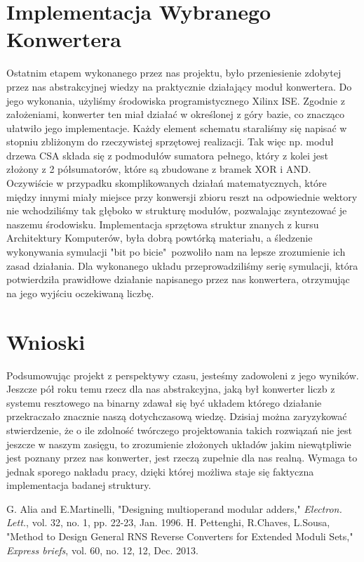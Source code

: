 \documentclass[comsoc]{IEEEtran}
\begin{document}
	
	
	\section{Implementacja Wybranego Konwertera}
	Ostatnim etapem wykonanego przez nas projektu, było przeniesienie zdobytej przez nas abstrakcyjnej wiedzy na praktycznie działający moduł konwertera.
	Do jego wykonania, użyliśmy środowiska programistycznego Xilinx ISE.
	Zgodnie z założeniami, konwerter ten miał działać w określonej z góry bazie, co znacząco ułatwiło jego implementacje. Każdy element schematu staraliśmy się napisać 
	w stopniu zbliżonym do rzeczywistej sprzętowej realizacji. Tak więc np. moduł drzewa CSA składa się z podmodułów sumatora pełnego, który z kolei jest złożony z 2 półsumatorów,
	które są zbudowane z bramek XOR i AND. Oczywiście w przypadku skomplikowanych działań matematycznych, które między innymi miały miejsce przy konwersji zbioru reszt na odpowiednie wektory
	nie wchodziliśmy tak głęboko w strukturę modułów, pozwalając zsyntezować je naszemu środowisku. Implementacja sprzętowa struktur znanych z kursu Architektury Komputerów,
	była dobrą powtórką materiału, a śledzenie wykonywania symulacji "bit po bicie"~pozwoliło nam na lepsze zrozumienie ich zasad działania. Dla wykonanego układu
	przeprowadziliśmy serię symulacji, która potwierdziła prawidłowe działanie napisanego przez nas konwertera, otrzymując na jego wyjściu oczekiwaną liczbę.
	
	\section{Wnioski}
	Podsumowując projekt z perspektywy czasu, jesteśmy zadowoleni z jego wyników. Jeszcze pół roku temu rzecz dla nas abstrakcyjna, jaką był konwerter liczb z systemu resztowego na binarny
	zdawał się być układem którego działanie przekraczało znacznie naszą dotychczasową wiedzę. Dzisiaj można zaryzykować stwierdzenie, że o ile zdolność twórczego projektowania takich
	rozwiązań nie jest jeszcze w naszym zasięgu, to zrozumienie złożonych układów jakim niewątpliwie jest poznany przez nas konwerter, jest rzeczą zupełnie dla nas realną.
	Wymaga to jednak sporego nakładu pracy, dzięki której możliwa staje się faktyczna implementacja badanej struktury.
	
	\begin{thebibliography}{1}
		
		G. Alia and E.Martinelli, "Designing multioperand modular adders," \emph{Electron. Lett.}, vol. 32, no. 1, pp. 22-23, Jan. 1996.
		H. Pettenghi, R.Chaves, L.Sousa, "Method to Design General RNS Reverse Converters for Extended Moduli Sets," \emph{Express briefs}, vol. 60, no. 12, 12, Dec. 2013. 
		
	\end{thebibliography}
\end{document}
